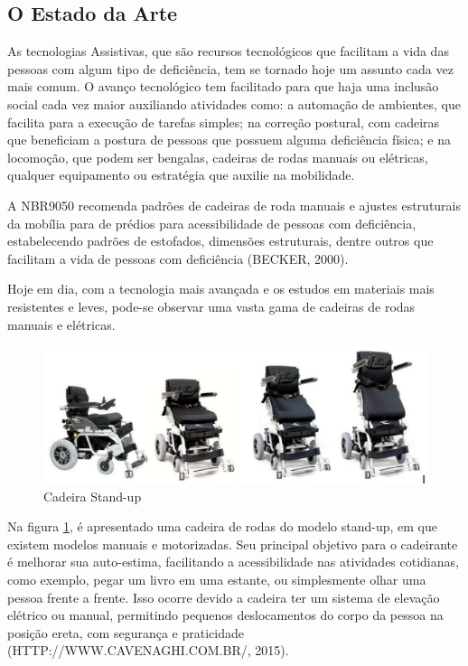 \subsection{O Estado da Arte}

As tecnologias Assistivas, que são recursos tecnológicos que facilitam a vida das pessoas com algum tipo de deficiência, tem se tornado hoje um assunto cada vez mais comum. O avanço tecnológico tem facilitado para que haja uma inclusão social cada vez maior auxiliando atividades como: a automação de ambientes, que facilita para a execução de tarefas simples; na correção postural, com cadeiras que beneficiam a postura de pessoas que possuem alguma deficiência física; e na locomoção, que podem ser bengalas, cadeiras de rodas manuais ou elétricas, qualquer equipamento ou estratégia que auxilie na mobilidade.

A NBR9050 recomenda padrões de cadeiras de roda manuais e ajustes estruturais da mobília para de prédios para acessibilidade de pessoas com deficiência, estabelecendo padrões de estofados, dimensões estruturais, dentre outros que facilitam a vida de pessoas com deficiência (BECKER, 2000).

Hoje em dia, com a tecnologia mais avançada e os estudos em materiais mais resistentes e leves, pode-se observar uma vasta gama de cadeiras de rodas manuais e elétricas.

\begin{figure}[!htb]
  \centering
  \includegraphics[keepaspectratio=true,scale=0.50]{figuras/introducao/versoes}
  \caption{Cadeira Stand-up}
  \label{fig:stand_up}
\end{figure}


Na figura \ref{fig:stand_up}, é apresentado uma cadeira de rodas do modelo stand-up, em que existem modelos manuais e motorizadas. Seu principal objetivo para o cadeirante é melhorar sua auto-estima, facilitando a acessibilidade nas atividades cotidianas, como exemplo, pegar um livro em uma estante, ou simplesmente olhar uma pessoa frente a frente. Isso ocorre devido a cadeira ter um sistema de elevação elétrico ou manual, permitindo pequenos deslocamentos do corpo da pessoa na posição ereta, com segurança e praticidade (HTTP://WWW.CAVENAGHI.COM.BR/, 2015).

